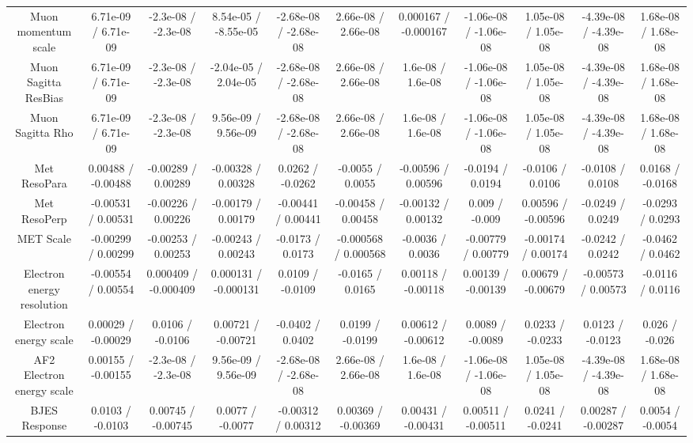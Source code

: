 \begin{table}[htbp]
\begin{center}
\begin{tabular}{|c|c|c|c|c|c|c|c|c|c|c|}
  Muon momentum scale & 6.71e-09 / 6.71e-09 & -2.3e-08 / -2.3e-08 & 8.54e-05 / -8.55e-05 & -2.68e-08 / -2.68e-08 & 2.66e-08 / 2.66e-08 & 0.000167 / -0.000167 & -1.06e-08 / -1.06e-08 & 1.05e-08 / 1.05e-08 & -4.39e-08 / -4.39e-08 & 1.68e-08 / 1.68e-08 \\ 
  Muon Sagitta ResBias & 6.71e-09 / 6.71e-09 & -2.3e-08 / -2.3e-08 & -2.04e-05 / 2.04e-05 & -2.68e-08 / -2.68e-08 & 2.66e-08 / 2.66e-08 & 1.6e-08 / 1.6e-08 & -1.06e-08 / -1.06e-08 & 1.05e-08 / 1.05e-08 & -4.39e-08 / -4.39e-08 & 1.68e-08 / 1.68e-08 \\ 
  Muon Sagitta Rho & 6.71e-09 / 6.71e-09 & -2.3e-08 / -2.3e-08 & 9.56e-09 / 9.56e-09 & -2.68e-08 / -2.68e-08 & 2.66e-08 / 2.66e-08 & 1.6e-08 / 1.6e-08 & -1.06e-08 / -1.06e-08 & 1.05e-08 / 1.05e-08 & -4.39e-08 / -4.39e-08 & 1.68e-08 / 1.68e-08 \\ 
  Met ResoPara & 0.00488 / -0.00488 & -0.00289 / 0.00289 & -0.00328 / 0.00328 & 0.0262 / -0.0262 & -0.0055 / 0.0055 & -0.00596 / 0.00596 & -0.0194 / 0.0194 & -0.0106 / 0.0106 & -0.0108 / 0.0108 & 0.0168 / -0.0168 \\ 
  Met ResoPerp & -0.00531 / 0.00531 & -0.00226 / 0.00226 & -0.00179 / 0.00179 & -0.00441 / 0.00441 & -0.00458 / 0.00458 & -0.00132 / 0.00132 & 0.009 / -0.009 & 0.00596 / -0.00596 & -0.0249 / 0.0249 & -0.0293 / 0.0293 \\ 
  MET Scale & -0.00299 / 0.00299 & -0.00253 / 0.00253 & -0.00243 / 0.00243 & -0.0173 / 0.0173 & -0.000568 / 0.000568 & -0.0036 / 0.0036 & -0.00779 / 0.00779 & -0.00174 / 0.00174 & -0.0242 / 0.0242 & -0.0462 / 0.0462 \\ 
  Electron energy resolution & -0.00554 / 0.00554 & 0.000409 / -0.000409 & 0.000131 / -0.000131 & 0.0109 / -0.0109 & -0.0165 / 0.0165 & 0.00118 / -0.00118 & 0.00139 / -0.00139 & 0.00679 / -0.00679 & -0.00573 / 0.00573 & -0.0116 / 0.0116 \\ 
  Electron energy scale & 0.00029 / -0.00029 & 0.0106 / -0.0106 & 0.00721 / -0.00721 & -0.0402 / 0.0402 & 0.0199 / -0.0199 & 0.00612 / -0.00612 & 0.0089 / -0.0089 & 0.0233 / -0.0233 & 0.0123 / -0.0123 & 0.026 / -0.026 \\ 
  AF2 Electron energy scale & 0.00155 / -0.00155 & -2.3e-08 / -2.3e-08 & 9.56e-09 / 9.56e-09 & -2.68e-08 / -2.68e-08 & 2.66e-08 / 2.66e-08 & 1.6e-08 / 1.6e-08 & -1.06e-08 / -1.06e-08 & 1.05e-08 / 1.05e-08 & -4.39e-08 / -4.39e-08 & 1.68e-08 / 1.68e-08 \\ 
  BJES Response & 0.0103 / -0.0103 & 0.00745 / -0.00745 & 0.0077 / -0.0077 & -0.00312 / 0.00312 & 0.00369 / -0.00369 & 0.00431 / -0.00431 & 0.00511 / -0.00511 & 0.0241 / -0.0241 & 0.00287 / -0.00287 & 0.0054 / -0.0054 \\ 

\end{tabular}
\end{center}
\end{table}
